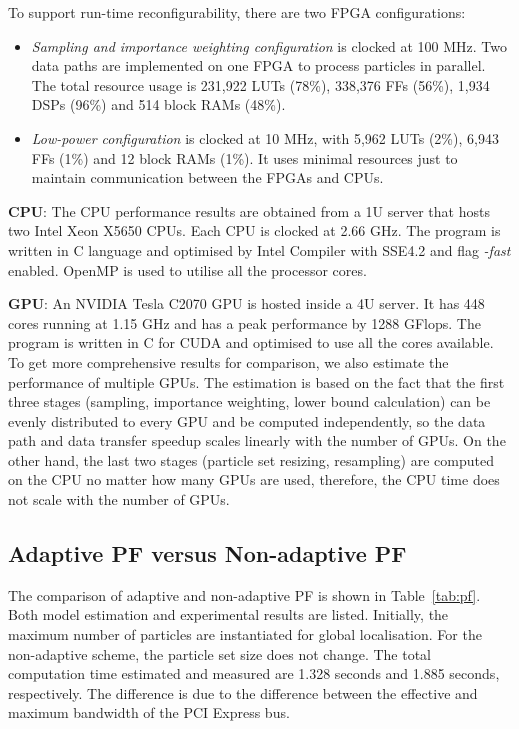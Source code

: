 To support run-time reconfigurability, there are two FPGA configurations:
\begin{itemize}
\item {\it Sampling and importance weighting configuration} is clocked at 100 MHz.
Two data paths are implemented on one FPGA to process particles in parallel.
The total resource usage is 231,922 LUTs (78\%), 338,376 FFs (56\%), 1,934 DSPs (96\%) and 514 block RAMs (48\%).
\item {\it Low-power configuration} is clocked at 10 MHz, with 5,962 LUTs (2\%), 6,943 FFs (1\%) and 12 block RAMs (1\%).
It uses minimal resources just to maintain communication between the FPGAs and CPUs.
\end{itemize}

\textbf{CPU}: The CPU performance results are obtained from a 1U server that hosts two Intel Xeon X5650 CPUs. 
Each CPU is clocked at 2.66 GHz.
The program is written in C language and optimised by Intel Compiler with SSE4.2 and flag {\it -fast} enabled.
OpenMP is used to utilise all the processor cores.

\textbf{GPU}: An NVIDIA Tesla C2070 GPU is hosted inside a 4U server.
It has 448 cores running at 1.15 GHz and has a peak performance by 1288 GFlops.
The program is written in C for CUDA and optimised to use all the cores available.
To get more comprehensive results for comparison, we also estimate the performance of multiple GPUs.
The estimation is based on the fact that the first three stages (sampling, importance weighting, lower bound calculation) can be evenly distributed to every GPU and be computed independently, 
so the data path and data transfer speedup scales linearly with the number of GPUs.
On the other hand, the last two stages (particle set resizing, resampling) are computed on the CPU no matter how many GPUs are used, therefore, the CPU time does not scale with the number of GPUs.

\subsection{Adaptive PF versus Non-adaptive PF}
The comparison of adaptive and non-adaptive PF is shown in Table~\ref{tab:pf}.
Both model estimation and experimental results are listed.
Initially, the maximum number of particles are instantiated for global localisation.
For the non-adaptive scheme, the particle set size does not change.
The total computation time estimated and measured are 1.328 seconds and 1.885 seconds, respectively.
The difference is due to the difference between the effective and maximum bandwidth of the PCI Express bus.

